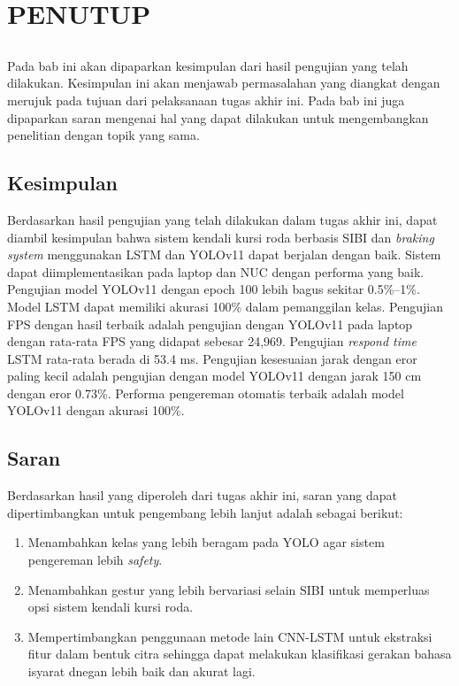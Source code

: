 \chapter{PENUTUP}
\label{sec:chap5_tutup}
\vspace{1ex}
\section*{}
Pada bab ini akan dipaparkan kesimpulan dari hasil pengujian yang telah dilakukan. Kesimpulan ini akan menjawab permasalahan yang diangkat dengan merujuk pada tujuan dari pelaksanaan tugas akhir ini. Pada bab ini juga dipaparkan saran mengenai hal yang dapat dilakukan untuk mengembangkan penelitian dengan topik yang sama. \vspace{1ex}

\section{Kesimpulan}
\label{sec:sec4_kesimpulan}
\vspace{1ex}
Berdasarkan hasil pengujian yang telah dilakukan dalam tugas akhir ini, dapat diambil kesimpulan bahwa sistem kendali kursi roda berbasis SIBI dan \emph{braking system} menggunakan LSTM dan YOLOv11 dapat berjalan dengan baik. Sistem dapat diimplementasikan pada laptop dan NUC dengan performa yang baik. Pengujian model YOLOv11 dengan epoch 100 lebih bagus sekitar 0.5\%–1\%. Model LSTM dapat memiliki akurasi 100\% dalam pemanggilan kelas. Pengujian FPS dengan hasil terbaik adalah pengujian dengan YOLOv11 pada laptop dengan rata-rata FPS yang didapat sebesar 24,969. Pengujian \emph{respond time} LSTM rata-rata berada di 53.4 ms. Pengujian kesesuaian jarak dengan eror paling kecil adalah pengujian dengan model YOLOv11 dengan jarak 150 cm dengan eror 0.73\%. Performa pengereman otomatis terbaik adalah model YOLOv11 dengan akurasi 100\%.
\section{Saran}
\label{sec:sec4_saran}
\vspace{1ex}
Berdasarkan hasil yang diperoleh dari tugas akhir ini, saran yang dapat dipertimbangkan untuk pengembang lebih lanjut adalah sebagai berikut:
\begin{enumerate}
    \item Menambahkan kelas yang lebih beragam pada YOLO agar sistem pengereman lebih \emph{safety}.
    \item Menambahkan gestur yang lebih bervariasi selain SIBI untuk memperluas opsi sistem kendali kursi roda.
    \item Mempertimbangkan penggunaan metode lain CNN-LSTM untuk ekstraksi fitur dalam bentuk citra sehingga dapat melakukan klasifikasi gerakan bahasa isyarat dnegan lebih baik dan akurat lagi.
\end{enumerate}


